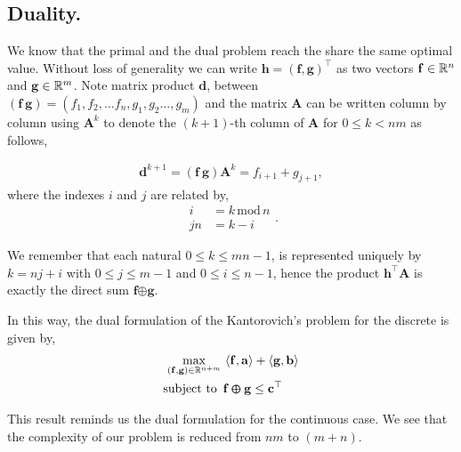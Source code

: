 \subsection{Duality.}
We know that the primal and the dual problem reach the share the same optimal value. Without loss of generality we can write $\mathbf{h}=(\mathbf{f}, \mathbf{g})^\top$ as two vectors $\mathbf{f}\in \mathbb{R}^n$ and $\mathbf{g}\in \mathbb{R}^m$. Note matrix product $\mathbf{d}$, between
$(\mathbf{f} \ \mathbf{g})=(f_1, f_2, \dots f_n, g_1, g_2\dots, g_m)$ and the matrix $\mathbf{A}$ can be written column by column using $\mathbf{A}^k$ to denote the $(k+1)$-th column of $\mathbf{A}$ for $0\leq k < nm$ as follows, 

\begin{align}
\mathbf{d}^{k+1}=(\mathbf{f} \ \mathbf{g})\mathbf{A}^k=f_{i+1}+g_{j+1},
\end{align}
where the indexes $i$ and $j$ are related by,
\begin{equation}
\begin{array}{ll}
i&=k\,\text{mod}\,n \\ jn&=k-i
\end{array}.	
\end{equation}


We remember that each natural $0\leq k\leq mn-1$, is represented uniquely by $k=nj+i$ with $0\leq j\leq m-1$ and $0\leq i \leq n-1$,  hence the product $\mathbf{h}^\top\mathbf{A}$ is exactly the direct sum $\mathbf{f}\pmb{\oplus}\mathbf{g}$. 

In this way, the dual formulation of the Kantorovich's problem for the discrete is given by,
\begin{align}
\max_{\mathbf{(f,g)}\in \mathbb{R}^{n+m}}\, &\left\langle \mathbf{f}, \mathbf{a} \right\rangle+\left\langle \mathbf{g}, \mathbf{b} \right\rangle\\	
\text{subject to }\, &\mathbf{f}\pmb{\oplus}\mathbf{g}\leq \mathbf{c}^\top
\end{align}

This result reminds us the dual formulation for the continuous case. We see that the complexity of our problem is reduced from $nm$ to $(m+n)$.

